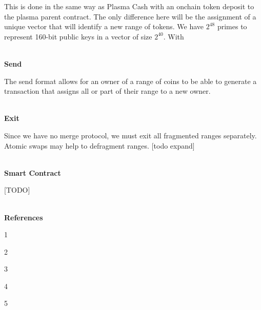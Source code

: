\documentclass[11pt]{article}
\begin{document}
This is done in the same way as Plasma Cash with an onchain token deposit to the plasma parent contract. The only difference here will be the assignment of a unique vector that will identify a new range of tokens. We have $2^{48}$ primes to represent 160-bit public keys in a vector of size $2^{40}$. With 
\\
\\
\centerline{\textbf{Send}}

The send format allows for an owner of a range of coins to be able to generate a transaction that assigns all or part of their range to a new owner. 
\\
\\
\centerline{\textbf{Exit}}

Since we have no merge protocol, we must exit all fragmented ranges separately. Atomic swaps may help to defragment ranges. [todo expand]
\\
\\
\centerline{\textbf{Smart Contract}}

[TODO]
\\
\\
\centerline{\textbf{References}}

1 \url{}

2 \url{}

3 \url{}

4 \url{}

5 \url{}
\end{document}
